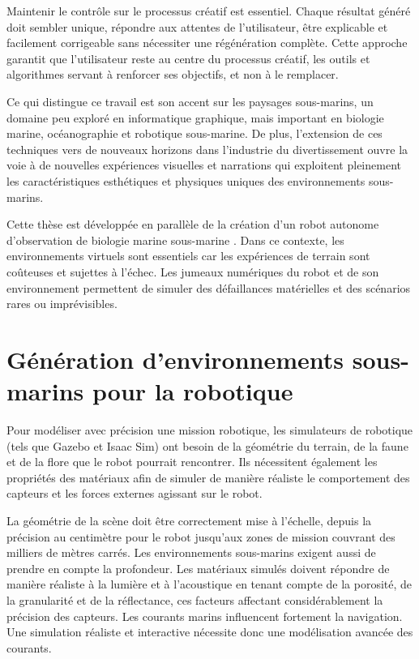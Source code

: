 Maintenir le contrôle sur le processus créatif est essentiel. Chaque résultat généré doit sembler unique, répondre aux attentes de l'utilisateur, être explicable et facilement corrigeable sans nécessiter une régénération complète. Cette approche garantit que l'utilisateur reste au centre du processus créatif, les outils et algorithmes servant à renforcer ses objectifs, et non à le remplacer.

Ce qui distingue ce travail est son accent sur les paysages sous-marins, un domaine peu exploré en informatique graphique, mais important en biologie marine, océanographie et robotique sous-marine. De plus, l'extension de ces techniques vers de nouveaux horizons dans l'industrie du divertissement ouvre la voie à de nouvelles expériences visuelles et narrations qui exploitent pleinement les caractéristiques esthétiques et physiques uniques des environnements sous-marins.

Cette thèse est développée en parallèle de la création d'un robot autonome d'observation de biologie marine sous-marine \cite{Maslin2021}. Dans ce contexte, les environnements virtuels sont essentiels car les expériences de terrain sont coûteuses et sujettes à l'échec. Les jumeaux numériques du robot et de son environnement permettent de simuler des défaillances matérielles et des scénarios rares ou imprévisibles.

\section*{Génération d'environnements sous-marins pour la robotique}

    Pour modéliser avec précision une mission robotique, les simulateurs de robotique (tels que Gazebo et Isaac Sim) ont besoin de la géométrie du terrain, de la faune et de la flore que le robot pourrait rencontrer. Ils nécessitent également les propriétés des matériaux afin de simuler de manière réaliste le comportement des capteurs et les forces externes agissant sur le robot.

La géométrie de la scène doit être correctement mise à l'échelle, depuis la précision au centimètre pour le robot jusqu'aux zones de mission couvrant des milliers de mètres carrés. Les environnements sous-marins exigent aussi de prendre en compte la profondeur. Les matériaux simulés doivent répondre de manière réaliste à la lumière et à l'acoustique en tenant compte de la porosité, de la granularité et de la réflectance, ces facteurs affectant considérablement la précision des capteurs.
Les courants marins influencent fortement la navigation. Une simulation réaliste et interactive nécessite donc une modélisation avancée des courants.

